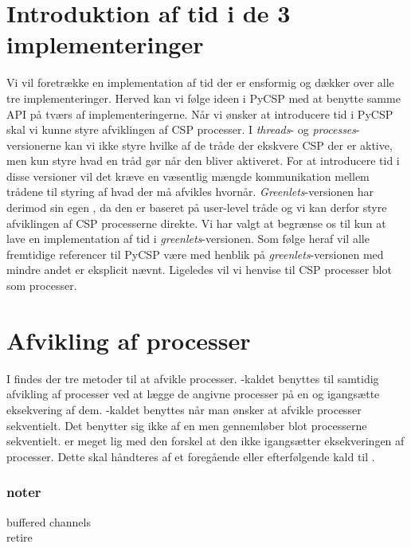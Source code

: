 \section{Introduktion af tid i de 3 implementeringer}
Vi vil foretrække en implementation af tid der er ensformig og dækker over alle tre implementeringer. Herved kan vi følge ideen i PyCSP med at benytte samme API på tværs af implementeringerne. Når vi ønsker at introducere tid i PyCSP skal vi kunne styre afviklingen af CSP processer. I  \emph{threads}- og \emph{processes}-versionerne kan vi ikke styre hvilke af de tråde der ekskvere CSP der er aktive, men kun styre hvad en tråd gør når den bliver aktiveret. For at introducere tid i disse versioner vil det kræve en væsentlig mængde kommunikation mellem trådene til styring af hvad der må afvikles hvornår. \emph{Greenlets}-versionen har derimod sin egen \sched , da den er baseret på user-level tråde og vi kan derfor styre afviklingen af CSP processerne direkte. Vi har valgt at begrænse os til kun at lave en implementation af tid i \emph{greenlets}-versionen. Som følge heraf vil alle fremtidige referencer til PyCSP være med henblik på \emph{greenlets}-versionen med mindre andet er eksplicit nævnt. Ligeledes vil vi henvise til CSP processer blot som processer. 

\section{Afvikling af processer}
I \pycsp findes der tre metoder til at afvikle processer. -kaldet benyttes til samtidig afvikling af processer ved at lægge de angivne processer på \sched en og igangsætte eksekvering af dem. -kaldet benyttes når man ønsker at afvikle processer sekventielt. Det benytter sig ikke af \sched en men gennemløber blot processerne sekventielt.  er meget lig  med den forskel at den ikke igangsætter eksekveringen af processer. Dette skal håndteres af et foregående eller efterfølgende kald til . 



\subsubsection{noter}
buffered channels\\
retire

